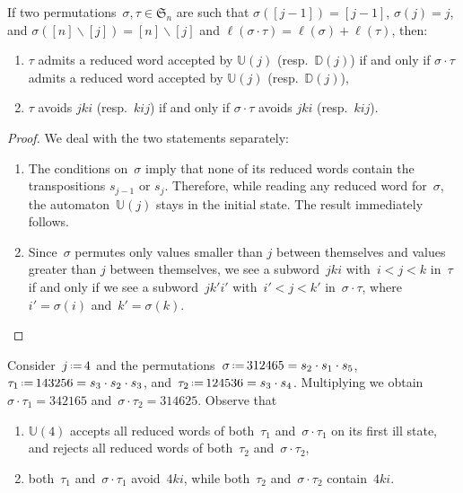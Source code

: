 \documentclass[ALCO]{cedram}
\newcommand{\fS}{\mathfrak{S}}
\newcommand{\ssm}{\smallsetminus}
\newcommand{\eqdef}{\mbox{\,\raisebox{0.2ex}{\scriptsize\ensuremath{\mathrm:}}\ensuremath{=}\,}}
\newcommand{\automatonU}{\mathbb{U}}
\newcommand{\automatonD}{\mathbb{D}}
\newcommand{\length}{\ell}
\begin{document}
\begin{lemma}\label{lem:vincent2}
If two permutations~$\sigma, \tau \in \fS_n$ are such that $\sigma([j-1]) = [j-1]$, $\sigma(j) = j$, and $\sigma([n]\ssm [j]) = [n]\ssm [j]$ and $\length(\sigma \cdot \tau) = \length(\sigma) + \length(\tau)$, then:
\begin{enumerate}
	\item $\tau$ admits a reduced word accepted by $\automatonU(j)$ (resp.~$\automatonD(j)$) if and only if $\sigma \cdot \tau$ admits a reduced word accepted by $\automatonU(j)$ (resp.~$\automatonD(j)$),
	\item $\tau$ avoids $jki$ (resp.~$kij$) if and only if $\sigma \cdot \tau$ avoids $jki$ (resp.~$kij$).
\end{enumerate}
\end{lemma}

\begin{proof}
We deal with the two statements separately:
\begin{enumerate} 
	\item The conditions on~$\sigma$ imply that none of its reduced words contain the transpositions $s_{j-1}$ or $s_j$. Therefore, while reading any reduced word for~$\sigma$, the automaton~$\automatonU(j)$ stays in the initial state. The result immediately follows.
	\item Since~$\sigma$ permutes only values smaller than $j$ between themselves and values greater than $j$ between themselves, we see a subword~$jki$ with~$i < j < k$ in~$\tau$ if and only if we see a subword~$jk'i'$ with~$i' < j < k'$ in~$\sigma \cdot \tau$, where~$i' = \sigma(i)$ and~$k' = \sigma(k)$.
	\qedhere
\end{enumerate}
\end{proof}

\begin{example}\label{exm:lemVincent2}
Consider~$j \eqdef 4$ and the permutations~$\sigma \eqdef 312465 = s_2 \cdot s_1 \cdot s_5$, $\tau_1 \eqdef 143256 = s_3 \cdot s_2 \cdot s_3$, and~$\tau_2 \eqdef 124536 = s_3 \cdot s_4$.
Multiplying we obtain~$\sigma\cdot\tau_1=342165$ and~$\sigma\cdot\tau_2 = 314625$. Observe that
\begin{enumerate}
	\item $\automatonU(4)$ accepts all reduced words of both~$\tau_1$ and~$\sigma\cdot \tau_1$ on its first ill state, and rejects all reduced words of both~$\tau_2$ and~$\sigma\cdot \tau_2$,
	\item both~$\tau_1$ and~$\sigma\cdot\tau_1$ avoid~$4ki$, while both~$\tau_2$ and~$\sigma\cdot\tau_2$ contain~$4ki$.
\end{enumerate}
\end{example}
\end{document}
